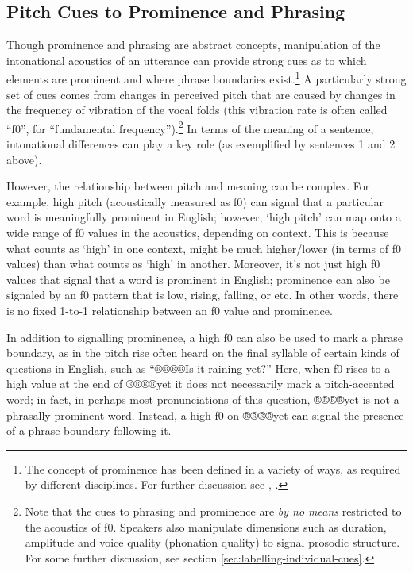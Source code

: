 \documentclass[11pt, twoside]{memoir}
\begin{document}
\subsection{Pitch Cues to Prominence and Phrasing}\label{sec:pitch-cues-to-prominence-and-phrasing}

Though prominence and phrasing are abstract concepts, manipulation of the intonational acoustics of an utterance can provide strong cues as to which elements are prominent and where phrase boundaries exist.\footnote{The concept of prominence has been defined in a variety of ways, as required by different disciplines. For further discussion see \citealt{gussenhoven15}, \citealt{wagner-15}.} A particularly strong set of cues comes from changes in perceived pitch that are caused by changes in the frequency of vibration of the vocal folds (this vibration rate is often called “f0”, for “fundamental frequency”).\footnote{Note that the cues to phrasing and prominence are \textit{by no means} restricted to the acoustics of f0.  Speakers also manipulate dimensions such as duration, amplitude and voice quality (phonation quality) to signal prosodic structure. For some further discussion, see section \ref{sec:labelling-individual-cues}.} In terms of the meaning of a sentence, intonational differences can play a key role (as exemplified by sentences 1 and 2 above).

However, the relationship between pitch and meaning can be complex. For example, high pitch (acoustically measured as f0) can signal that a particular word is meaningfully prominent in English; however, ‘high pitch’ can map onto a wide range of f0 values in the acoustics, depending on context. This is because what counts as ‘high’ in one context, might be much higher\slash lower (in terms of f0 values) than what counts as ‘high’ in another. Moreover, it’s not just high f0 values that signal that a word is prominent in English; prominence can also be signaled by an f0 pattern that is low, rising, falling, or etc. In other words, there is no fixed 1-to-1 relationship between an f0 value and prominence.

In addition to signalling prominence, a high f0 can also be used to mark a phrase boundary, as in the pitch rise often heard on the final syllable of certain kinds of questions in English, such as “®®®®{Is it raining yet?}” Here, when f0 rises to a high value at the end of ®®®®{yet} it does not necessarily mark a pitch-accented word; in fact, in perhaps most pronunciations of this question, ®®®®{yet} is \uline{not} a phrasally-prominent word. Instead, a high f0 on ®®®®{yet} can signal the presence of a phrase boundary following it.
\end{document}
